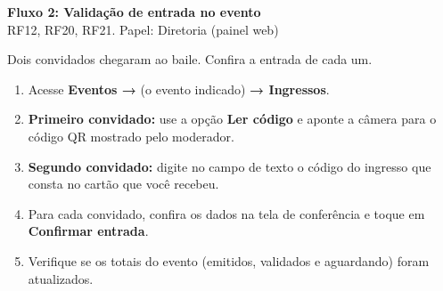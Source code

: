 \documentclass[11pt,a4paper]{article}
\begin{document}
\begin{center}
  {\LARGE\bfseries\color{brandgreen} Fluxo 2: Validação de entrada no evento}\\[1mm]
  {\large RF12, RF20, RF21. Papel: Diretoria (painel web)}
\end{center}

\vspace{2mm}
Dois convidados chegaram ao baile. Confira a entrada de cada um.

\begin{enumerate}[leftmargin=6mm]
  \item Acesse \textbf{Eventos →} (o evento indicado) \textbf{→ Ingressos}.
  \item \textbf{Primeiro convidado:} use a opção \textbf{Ler código} e aponte a câmera para o código
    QR mostrado pelo moderador.
  \item \textbf{Segundo convidado:} digite no campo de texto o código do ingresso que consta no
    cartão que você recebeu.
  \item Para cada convidado, confira os dados na tela de conferência e toque em \textbf{Confirmar
    entrada}.
  \item Verifique se os totais do evento (emitidos, validados e aguardando) foram atualizados.
\end{enumerate}
\end{document}
